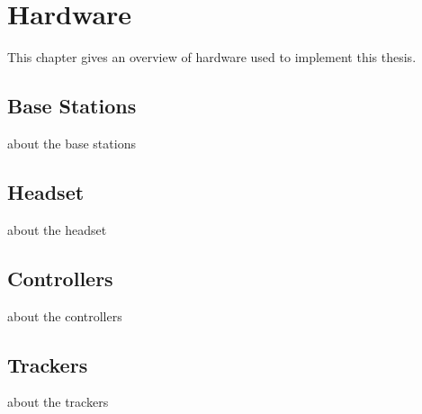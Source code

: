 
\chapter{Hardware}\label{chapter:Hardware}

This chapter gives an overview of hardware used to implement this thesis.


\section{Base Stations}
about the base stations


\section{Headset}
about the headset


\section{Controllers}
about the controllers


\section{Trackers}
about the trackers